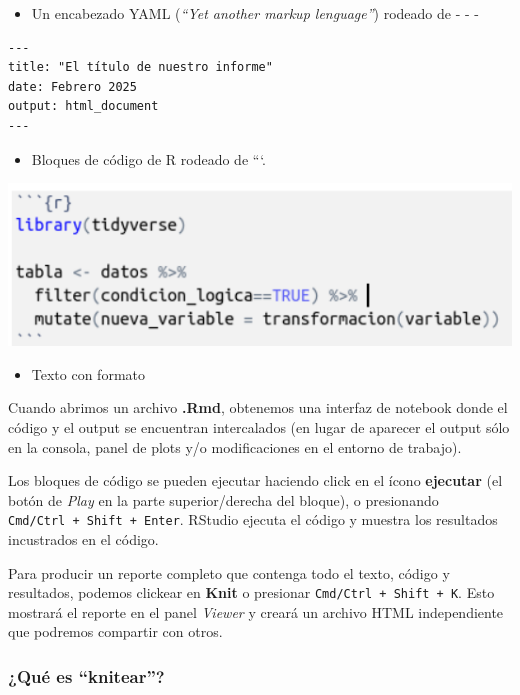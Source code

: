 \documentclass[
]{article}
\providecommand{\tightlist}{%
  \setlength{\itemsep}{0pt}\setlength{\parskip}{0pt}}
\begin{document}
\begin{itemize}
\tightlist
\item
  Un encabezado YAML (\emph{``Yet another markup lenguage''}) rodeado de
  - - -
\end{itemize}

\begin{verbatim}
---
title: "El título de nuestro informe"
date: Febrero 2025
output: html_document
---
\end{verbatim}

\begin{itemize}
\tightlist
\item
  Bloques de código de R rodeado de ```.
\end{itemize}

\includegraphics{img/Selection_008.png}

\begin{itemize}
\tightlist
\item
  Texto con formato
\end{itemize}

Cuando abrimos un archivo \textbf{.Rmd}, obtenemos una interfaz de
notebook donde el código y el output se encuentran intercalados (en
lugar de aparecer el output sólo en la consola, panel de plots y/o
modificaciones en el entorno de trabajo).

Los bloques de código se pueden ejecutar haciendo click en el ícono
\textbf{ejecutar} (el botón de \emph{Play} en la parte superior/derecha
del bloque), o presionando \texttt{Cmd/Ctrl\ +\ Shift\ +\ Enter}.
RStudio ejecuta el código y muestra los resultados incustrados en el
código.

Para producir un reporte completo que contenga todo el texto, código y
resultados, podemos clickear en \textbf{Knit} o presionar
\texttt{Cmd/Ctrl\ +\ Shift\ +\ K}. Esto mostrará el reporte en el panel
\emph{Viewer} y creará un archivo HTML independiente que podremos
compartir con otros.

\subsubsection{¿Qué es ``knitear''?}\label{quuxe9-es-knitear}
\end{document}
